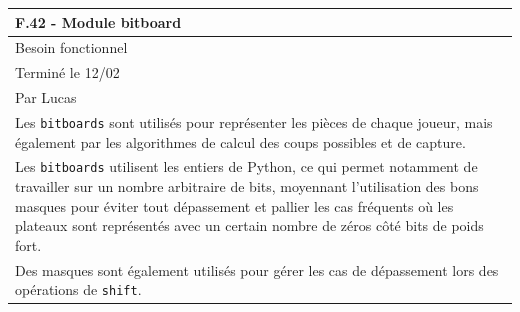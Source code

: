 \documentclass[a4paper,12pt]{article}
\begin{document}
\noindent
\setlength{\arrayrulewidth}{1.5pt}
\renewcommand{\arraystretch}{1.5}
\begin{tabularx}{\textwidth}{|X|}
    \hline
    \textbf{F.42 - Module bitboard}                                                                                                                                                                                                                                                                                              \\
    \hline
    Besoin fonctionnel                                                                                                                                                                                                                                                                                                           \\
    \hline
    Terminé le 12/02                                                                                                                                                                                                                                                                                                             \\
    Par Lucas                                                                                                                                                                                                                                                                                                                    \\
    \hline
    Les \texttt{bitboards} sont utilisés pour représenter les pièces de chaque joueur, mais également par les algorithmes de calcul des coups possibles et de capture.                                                                                                                                                           \\
    Les \texttt{bitboards} utilisent les entiers de Python, ce qui permet notamment de travailler sur un nombre arbitraire de bits, moyennant l’utilisation des bons masques pour éviter tout dépassement et pallier les cas fréquents où les plateaux sont représentés avec un certain nombre de zéros côté bits de poids fort. \\
    Des masques sont également utilisés pour gérer les cas de dépassement lors des opérations de \texttt{shift}.                                                                                                                                                                                                                 \\

\end{tabularx}
\end{document}
